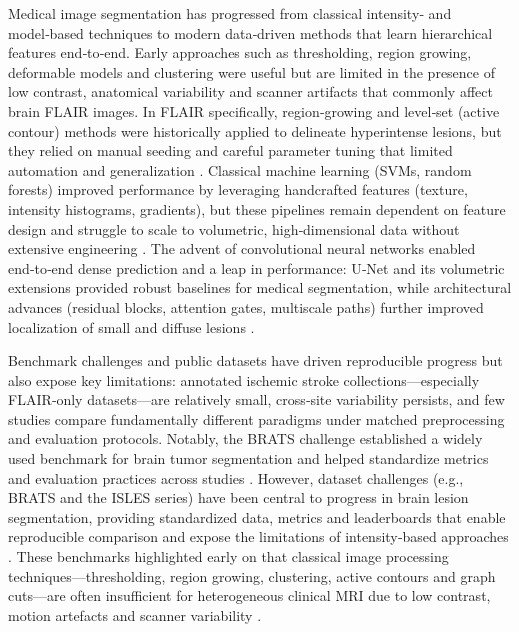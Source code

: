 \documentclass[12pt]{article}
\begin{document}
Medical image segmentation has progressed from classical intensity‑ and model‑based techniques to modern data‑driven methods that learn hierarchical features end‑to‑end. Early approaches such as thresholding, region growing, deformable models and clustering were useful but are limited in the presence of low contrast, anatomical variability and scanner artifacts that commonly affect brain FLAIR images. In FLAIR specifically, region‑growing and level‑set (active contour) methods were historically applied to delineate hyperintense lesions, but they relied on manual seeding and careful parameter tuning that limited automation and generalization \cite{qianActiveContourModel2013,steinStatisticalDeformableModel2001}. Classical machine learning (SVMs, random forests) improved performance by leveraging handcrafted features (texture, intensity histograms, gradients), but these pipelines remain dependent on feature design and struggle to scale to volumetric, high‑dimensional data without extensive engineering \cite{geremiaSpatialDecisionForests2011}. The advent of convolutional neural networks enabled end‑to‑end dense prediction and a leap in performance: U‑Net and its volumetric extensions provided robust baselines for medical segmentation, while architectural advances (residual blocks, attention gates, multiscale paths) further improved localization of small and diffuse lesions \cite{Ronneberger2015,Milletari2016,He2016,Oktay2018}.

Benchmark challenges and public datasets have driven reproducible progress but also expose key limitations: annotated ischemic stroke collections—especially FLAIR‑only datasets—are relatively small, cross‑site variability persists, and few studies compare fundamentally different paradigms under matched preprocessing and evaluation protocols. Notably, the BRATS challenge established a widely used benchmark for brain tumor segmentation and helped standardize metrics and evaluation practices across studies \cite{Menze2015}. However, dataset challenges (e.g., BRATS and the ISLES series) have been central to progress in brain lesion segmentation, providing standardized data, metrics and leaderboards that enable reproducible comparison and expose the limitations of intensity‑based approaches \cite{Menze2015}. These benchmarks highlighted early on that classical image processing techniques—thresholding, region growing, clustering, active contours and graph cuts—are often insufficient for heterogeneous clinical MRI due to low contrast, motion artefacts and scanner variability \cite{qianActiveContourModel2013,steinStatisticalDeformableModel2001,boykovInteractiveGraphCuts2001}. 
\end{document}
